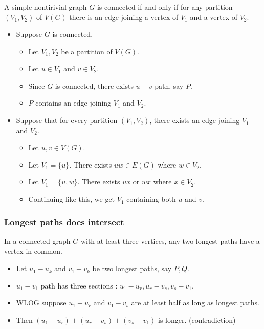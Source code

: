 \documentclass{beamer}
\begin{document}
\begin{frame}
\frametitle{}
	A simple nontirivial graph $G$ is connected if and only if for any partition $(V_1,V_2)$ of $V(G)$ there is an edge joining a vertex of $V_1$ and a vertex of $V_2$.
\begin{itemize}
	\item Suppose $G$ is connected.
	\begin{itemize}
		\item Let $V_1,V_2$ be a partition of $V(G)$.
		\item Let $u \in V_1$ and $v \in V_2$.
		\item Since $G$ is connected, there exists $u-v$ path, say $P$.
		\item $P$ contains an edge joining $V_1$ and $V_2$.
	\end{itemize}
	\item Suppose that for every partition $(V_1,V_2)$, there exists an edge joining $V_1$ and $V_2$.
	\begin{itemize}
		\item Let $u,v \in V(G)$.
		\item Let $V_1 = \{ u \}$. There exists $uw \in E(G)$ where $w \in V_2$.
		\item Let $V_1 = \{ u,w \}$. There exists $ux$ or $wx$ where $x \in V_2$.
		\item Continuing like this, we get $V_1$ containing both $u$ and $v$.
	\end{itemize}
\end{itemize}
\end{frame}

\begin{frame}
\frametitle{Longest paths does intersect}
	In a connected graph $G$ with at least three vertices, any two longest paths have a vertex in common.
\begin{itemize}
	\item Let $u_1-u_k$ and $v_1-v_k$ be two longest paths, say $P,Q$.
	\item $u_1-v_1$ path has three sections : $u_1-u_r, u_r-v_s,v_s-v_1$.
	\item WLOG suppose $u_1-u_r$ and $v_1-v_s$ are at least half as long as longest paths.
	\item \alert{Then $(u_1-u_r) + (u_r-v_s) + (v_s-v_1)$ is longer. (contradiction)}
\end{itemize}
\end{frame}
\end{document}
